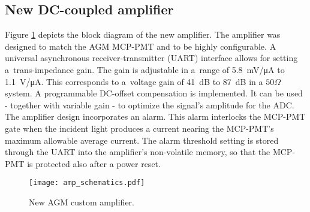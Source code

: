 \subsection{New DC-coupled amplifier}

Figure \ref{fig:amp_schematics} depicts the block diagram of the new amplifier.
%
The amplifier was designed to match the AGM MCP-PMT and to be  highly configurable.
%
A universal asynchronous receiver-transmitter (UART) interface allows for setting a~trans-impedance gain.
%
The gain is adjustable in a~range of \SI{5.8}{mV/\micro A} to \SI{1.1}{V/\micro A}.
%
This corresponds to a~voltage gain of \SI{41}{dB} to \SI{87}{dB} in a $50\Omega$ system.
%
A programmable DC-offset compensation is implemented.
%
It can be used - together with variable gain - to optimize the signal's amplitude for the ADC.
%
The amplifier design incorporates an alarm. This alarm interlocks the MCP-PMT gate when the incident light produces a current nearing the MCP-PMT's maximum allowable average current.
%
The alarm threshold setting is stored through the UART into the amplifier's non-volatile memory, so that 
the MCP-PMT is protected also after a power reset. %
%
%
\begin{figure}[!tbh]
    \centering
    \texttt{[image: amp\_schematics.pdf]}
    \caption{New AGM custom amplifier.}
    \label{fig:amp_schematics}
\end{figure}
%
